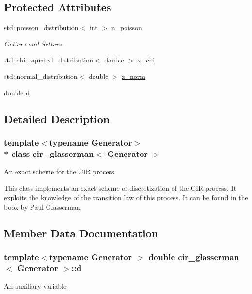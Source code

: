 \subsection*{Protected Attributes}
\begin{DoxyCompactItemize}
\item 
std\+::poisson\+\_\+distribution$<$ int $>$ \hyperlink{classcir__glasserman_aed2bd8f09e275a2fd0012989771c61f7}{n\+\_\+poisson}
\begin{DoxyCompactList}\small\item\em Getters and Setters. \end{DoxyCompactList}\item 
std\+::chi\+\_\+squared\+\_\+distribution$<$ double $>$ \hyperlink{classcir__glasserman_a1f91410b367839c4b81e8e89e9597848}{x\+\_\+chi}
\item 
std\+::normal\+\_\+distribution$<$ double $>$ \hyperlink{classcir__glasserman_ab16c1db0bb521957833f67c690b6b8a4}{z\+\_\+norm}
\item 
double \hyperlink{classcir__glasserman_ad43d0610db68017bf054096cda60b27e}{d}
\end{DoxyCompactItemize}


\subsection{Detailed Description}
\subsubsection*{template$<$typename Generator$>$\\*
class cir\+\_\+glasserman$<$ Generator $>$}

An exact scheme for the C\+IR process. 

This class implements an exact scheme of discretization of the C\+IR process. It exploits the knowledge of the transition law of this process. It can be found in the book by Paul Glasserman. 

\subsection{Member Data Documentation}
\subsubsection[{\texorpdfstring{d}{d}}]{\setlength{\rightskip}{0pt plus 5cm}template$<$typename Generator $>$ double {\bf cir\+\_\+glasserman}$<$ Generator $>$\+::d\hspace{0.3cm}{\ttfamily [protected]}}\hypertarget{classcir__glasserman_ad43d0610db68017bf054096cda60b27e}{}\label{classcir__glasserman_ad43d0610db68017bf054096cda60b27e}
An auxiliary variable 
